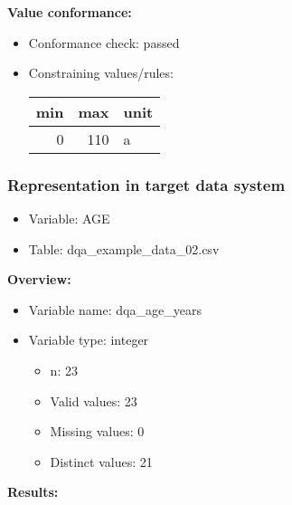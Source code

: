 \documentclass[
]{article}
\providecommand{\tightlist}{%
  \setlength{\itemsep}{0pt}\setlength{\parskip}{0pt}}
\begin{document}
\textbf{Value conformance:}

\begin{itemize}
\tightlist
\item
  Conformance check: passed
\item
  Constraining values/rules:

  \begin{table}[H]
  \centering
  \begin{tabular}{r|r|l}
  \hline
  \textbf{min} & \textbf{max} & \textbf{unit}\\
  \hline
  0 & 110 & a\\
  \hline
  \end{tabular}
  \end{table}
\end{itemize}

\newpage

\hypertarget{representation-in-target-data-system}{%
\subsubsection{\texorpdfstring{Representation in \textbf{target} data
system}{Representation in target data system}}\label{representation-in-target-data-system}}

\begin{itemize}
\tightlist
\item
  Variable: AGE
\item
  Table: dqa\_example\_data\_02.csv
\end{itemize}

\textbf{Overview:}

\begin{itemize}
\tightlist
\item
  Variable name: dqa\_age\_years
\item
  Variable type: integer

  \begin{itemize}
  \tightlist
  \item
    n: 23
  \item
    Valid values: 23
  \item
    Missing values: 0
  \item
    Distinct values: 21
  \end{itemize}
\end{itemize}

\textbf{Results:}\\
\end{document}
